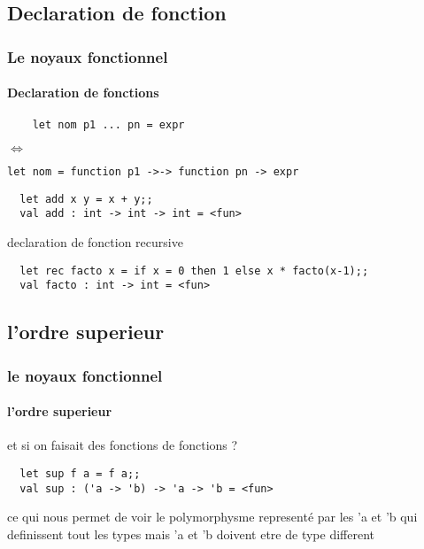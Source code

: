 \subsection{Declaration de fonction}
\begin{frame}[fragile]
  \frametitle{Le noyaux fonctionnel}
  \framesubtitle{Declaration de fonctions}
    \begin{lstlisting}
	let nom p1 ... pn = expr
	\end{lstlisting}
	\begin{center}
	  \begin{rotate}{90}
     $\Leftrightarrow$
   \end{rotate}
 \end{center}
	\begin{lstlisting}
let nom = function p1 ->-> function pn -> expr
  \end{lstlisting}
  \vspace{1cm}
  \begin{lstlisting}
  let add x y = x + y;;
  val add : int -> int -> int = <fun>
  \end{lstlisting}
  declaration de fonction recursive 
  \begin{lstlisting}
  let rec facto x = if x = 0 then 1 else x * facto(x-1);;
  val facto : int -> int = <fun>
  \end{lstlisting}
\end{frame}

\subsection{l'ordre superieur}
\begin{frame}[fragile]
  \frametitle{le noyaux fonctionnel}
  \framesubtitle{l'ordre superieur}
  et si on faisait des fonctions de fonctions ? 
 \begin{lstlisting}
  let sup f a = f a;;
  val sup : ('a -> 'b) -> 'a -> 'b = <fun>
 \end{lstlisting}
 ce qui nous permet de voir le polymorphysme representé par les 'a et 'b qui definissent tout les types mais 'a et 'b doivent etre de type different
\end{frame}

